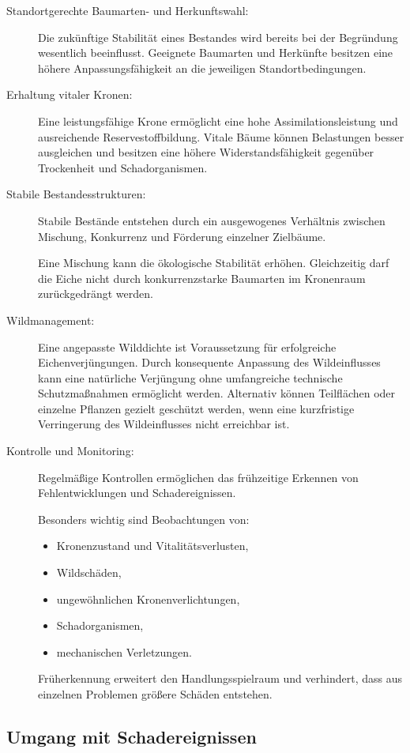 \documentclass[twocolumn, bibliography=totoc, abstract=true]{scrartcl}
\begin{document}
\begin{description}
\item[Standortgerechte Baumarten- und Herkunftswahl:] Die zukünftige Stabilität eines Bestandes wird bereits bei der Begründung wesentlich beeinflusst. Geeignete Baumarten und Herkünfte besitzen eine höhere Anpassungsfähigkeit an die jeweiligen Standortbedingungen.
\item[Erhaltung vitaler Kronen:] Eine leistungsfähige Krone ermöglicht eine hohe Assimilationsleistung und ausreichende Reservestoffbildung. Vitale Bäume können Belastungen besser ausgleichen und besitzen eine höhere Widerstandsfähigkeit gegenüber Trockenheit und Schadorganismen.
\item[Stabile Bestandesstrukturen:] Stabile Bestände entstehen durch ein ausgewogenes Verhältnis zwischen Mischung, Konkurrenz und Förderung einzelner Zielbäume.

Eine Mischung kann die ökologische Stabilität erhöhen. Gleichzeitig darf die Eiche nicht durch konkurrenzstarke Baumarten im Kronenraum zurückgedrängt werden.
\item[Wildmanagement:] Eine angepasste Wilddichte ist Voraussetzung für erfolgreiche Eichenverjüngungen. Durch konsequente Anpassung des Wildeinflusses kann eine natürliche Verjüngung ohne umfangreiche technische Schutzmaßnahmen ermöglicht werden. Alternativ können Teilflächen oder einzelne Pflanzen gezielt geschützt werden, wenn eine kurzfristige Verringerung des Wildeinflusses nicht erreichbar ist.
\item[Kontrolle und Monitoring:] Regelmäßige Kontrollen ermöglichen das frühzeitige Erkennen von Fehlentwicklungen und Schadereignissen.

Besonders wichtig sind Beobachtungen von:

\begin{itemize}
\item Kronenzustand und Vitalitätsverlusten,
\item Wildschäden,
\item ungewöhnlichen Kronenverlichtungen,
\item Schadorganismen,
\item mechanischen Verletzungen.
\end{itemize}

Früherkennung erweitert den Handlungsspielraum und verhindert, dass aus einzelnen Problemen größere Schäden entstehen.
\end{description}

\subsection{Umgang mit Schadereignissen}
\end{document}

